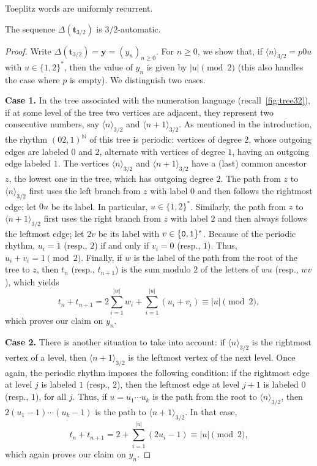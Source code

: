 \documentclass[12pt,reqno]{article}
\newcommand{\cA}{\{{\tt 0},{\tt 1}\}}
\begin{document}
\begin{proposition}
\label{pro: Toeplitz words are unif rec}
Toeplitz words are uniformly recurrent.
\end{proposition}

\begin{lemma}
  The sequence $\Delta(\mathbf{t}_{3/2})$ is $3/2$-automatic.
\end{lemma}

\begin{proof}
Write $\Delta(\mathbf{t}_{3/2})=\mathbf{y}=(y_n)_{n\ge 0}$. 
For $n\ge 0$,  we show that,  if $\langle n\rangle_{3/2}=p0u$ with $u\in\{1,2\}^*$,  then the value of $y_n$ is given by $|u|\pmod{2}$ (this also handles the case where $p$ is empty).   We distinguish two cases. 
 
{\bf Case 1.} In the tree associated with the numeration language (recall~\cref{fig:tree32}),  if at some level of the tree two vertices are adjacent, they represent two consecutive numbers,  say $\langle n\rangle_{3/2}$ and $\langle n+1\rangle_{3/2}$.  As mentioned in the introduction,  the rhythm $(02,1)^\mathbb{N}$ of this tree is periodic: vertices of degree $2$, whose outgoing edges are labeled $0$ and $2$, alternate with vertices of degree $1$,  having an outgoing edge labeled $1$. 
The vertices $\langle n\rangle_{3/2}$ and $\langle n+1\rangle_{3/2}$ have a (last) common ancestor $z$,  the lowest one in the tree,  which has outgoing degree $2$. 
  The path from $z$ to $\langle n\rangle_{3/2}$ first uses the left branch from $z$ with label $0$ and then follows the rightmost edge; let $0u$ be its label. In particular, $u\in\{1,2\}^*$. Similarly, the path from $z$ to $\langle n+1\rangle_{3/2}$ first uses the right branch from $z$ with label $2$ and then always follows the leftmost edge; let $2v$ be its label with $v\in\cA^*$. 
Because of the periodic rhythm, $u_i=1$ (resp.,   $2$) if and only if $v_i=0$ (resp.,   $1$). Thus, $u_i+v_i=1 \pmod{2}$. Finally, if $w$ is the label of the path from the root of the tree to $z$, then $t_n$ (resp.,   $t_{n+1}$) is the sum modulo $2$ of the letters of $wu$ (resp.,   $wv$),  which yields
\[
 t_n+t_{n+1}=2\sum_{i=1}^{|w|} w_i + \sum_{i=1}^{|u|} (u_i+v_i)\equiv |u| \pmod{2},
\]
which proves our claim on $y_n$.

{\bf Case 2.}
There is another situation to take into account: if $\langle n\rangle_{3/2}$ is the rightmost vertex of a level, then $\langle n+1\rangle_{3/2}$ is the leftmost vertex of the next level. Once again, the periodic rhythm imposes the following condition:
if the rightmost edge at level $j$ is labeled $1$ (resp.,   $2$), then the leftmost edge at level $j+1$ is labeled $0$ (resp.,   $1$), for all $j$. Thus, if $u=u_1\cdots u_k$ is the path from the root to $\langle n\rangle_{3/2}$, then $2(u_1-1)\cdots (u_k-1)$ is the path to $\langle n+1\rangle_{3/2}$. In that case,
\[
  t_n+t_{n+1}=2+\sum_{i=1}^{|u|} (2u_i-1)\equiv |u| \pmod{2},
\]
which again proves our claim on $y_n$.


\end{proof}
\end{document}
